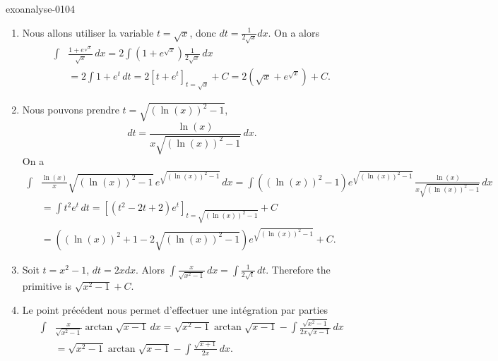 
\begin{corrige}{exoanalyse-0104}

  \begin{enumerate}
  \item Nous allons utiliser la variable $t= \sqrt{x}$, donc $dt = \frac{1}{2\sqrt{x}} dx$. On a alors  
    \begin{equation*}
      \begin{aligned}
        \int &\frac{1+e^{\sqrt{x}}}{\sqrt{x}}\, dx = 2\int (1+e^{\sqrt{x}})\frac{1}{2\sqrt{x}}\, dx \\ 
&= 2 \int 1+e^t \, dt = 2\left[t + e^t\right]_{t=\sqrt{x}} + C = 2\left(\sqrt{x} + e^{\sqrt{x}}\right) + C.
      \end{aligned}
    \end{equation*}
  \item Nous pouvons prendre $t= \sqrt{(\ln(x))^2-1}$, 
\[
dt = \frac{\ln(x)}{x\sqrt{(\ln(x))^2-1}}\, dx.  
\]
On a 
\begin{equation*}
  \begin{aligned}
    \int &\frac{\ln(x)}{x}\sqrt{(\ln(x))^2-1}\, e^{\sqrt{(\ln(x))^2-1}}\, dx = \int ((\ln(x))^2-1) e^{\sqrt{(\ln(x))^2-1}}\,\frac{\ln(x)}{x\sqrt{(\ln(x))^2-1}}\, dx \\
    &= \int t^2 e^t\, dt= \left[(t^2-2t +2) e^t\right]_{t=\sqrt{(\ln(x))^2-1}} + C \\
    & = \left((\ln(x))^2+1 -2 \sqrt{(\ln(x))^2-1} \right) e^{\sqrt{(\ln(x))^2-1}} + C.
  \end{aligned}
\end{equation*}
  \item Soit $t= x^2-1$, $dt = 2x dx$. Alors $\displaystyle \int \frac{x}{\sqrt{x^2-1}}\, dx = \int \frac{1}{2\sqrt{t}} \, dt$.  Therefore the primitive is $\sqrt{x^2-1} +C$.
  \item Le point pr\'ec\'edent nous permet d'effectuer une int\'egration par parties 
    \begin{equation*}
      \begin{aligned}
        \int&  \frac{x}{\sqrt{x^2-1}} \arctan{\sqrt{x-1}}\, dx = \sqrt{x^2-1} \arctan{\sqrt{x-1}} - \int \frac{\sqrt{x^2-1}}{2x\sqrt{x-1}}\, dx\\
&=\sqrt{x^2-1} \arctan{\sqrt{x-1}} - \int \frac{\sqrt{x+1}}{2x}\, dx.
      \end{aligned}
    \end{equation*}

\end{enumerate}
\end{corrige}
